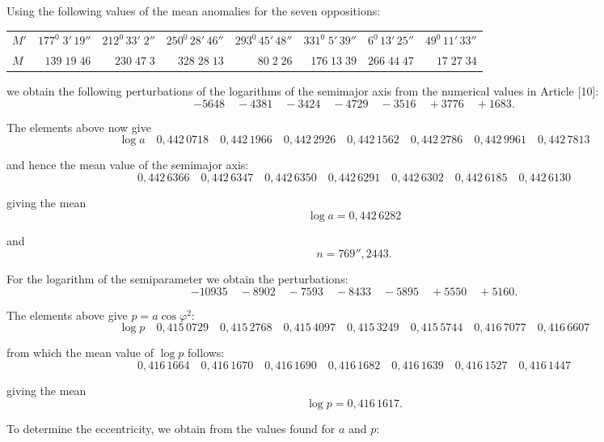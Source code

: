 \begin{landscape}
\par\noindent\hspace*{\parindent}Using the following values of the mean anomalies for the seven oppositions:
\begingroup
\small\setlength{\tabcolsep}{5pt}\renewcommand{\arraystretch}{1.18}
\begin{center}
\begin{tabular}{@{}lrrrrrrr@{}}
\(M'\)&\(177^0\;3'\,19''\)&\(212^0\,33'\;2''\)&\(250^0\,28'\,46''\)&\(293^0\,45'\,48''\)&\(331^0\;5'\,39''\)&\(6^0\,13'\,25''\)&\(49^0\,11'\,33''\)\\
\(M\)&\(139\;19\;46\)&\(230\;47\;3\)&\(328\;28\;13\)&\(80\;2\;26\)&\(176\;13\;39\)&\(266\;44\;47\)&\(17\;27\;34\)
\end{tabular}
\end{center}
\endgroup
\par\noindent we obtain the following perturbations of the logarithms of the semimajor axis from the numerical values in Article [10]:
\[
-5648\quad-4381\quad-3424\quad-4729\quad-3516\quad+3776\quad+1683.
\]
\par\noindent The elements above now give
\[
\log a\quad 0{,}442\,0718\quad0{,}442\,1966\quad0{,}442\,2926\quad0{,}442\,1562\quad0{,}442\,2786\quad0{,}442\,9961\quad0{,}442\,7813
\]
\par\noindent and hence the mean value of the semimajor axis:
\[
0{,}442\,6366\quad0{,}442\,6347\quad0{,}442\,6350\quad0{,}442\,6291\quad0{,}442\,6302\quad0{,}442\,6185\quad0{,}442\,6130
\]
\par\noindent giving the mean
\[
\log a=0{,}442\,6282
\]
\par\noindent and
\[
n=769''{,}2443.
\]
\par\noindent\hspace*{\parindent}For the logarithm of the semiparameter we obtain the perturbations:
\[
-10935\quad-8902\quad-7593\quad-8433\quad-5895\quad+5550\quad+5160.
\]
\par\noindent The elements above give \(p=a\cos\varphi^2\):
\[
\log p\quad0{,}415\,0729\quad0{,}415\,2768\quad0{,}415\,4097\quad0{,}415\,3249\quad0{,}415\,5744\quad0{,}416\,7077\quad0{,}416\,6607
\]
\par\noindent from which the mean value of \(\log p\) follows:
\[
0{,}416\,1664\quad0{,}416\,1670\quad0{,}416\,1690\quad0{,}416\,1682\quad0{,}416\,1639\quad0{,}416\,1527\quad0{,}416\,1447
\]
\par\noindent giving the mean
\[
\log p=0{,}416\,1617.
\]
\par\noindent To determine the eccentricity, we obtain from the values found for \(a\) and \(p\):

\end{landscape}
